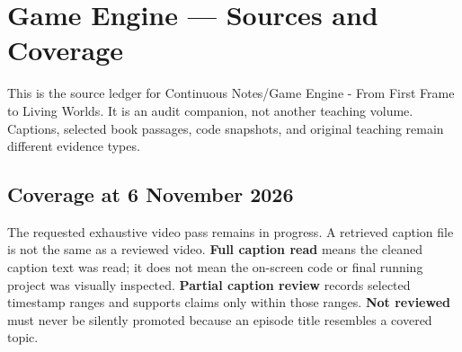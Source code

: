 \hypertarget{appendix-877738f6f4d2}{}\label{referencestart:appendix-877738f6f4d2}
\section{Game Engine --- Sources and Coverage}\label{appendix-877738f6f4d2-game-engine-sources-and-coverage}

\hypertarget{appendix-877738f6f4d2-game-engine-sources-and-coverage}{}

This is the source ledger for {Continuous Notes/Game Engine - From First Frame to Living Worlds}. It is an audit companion, not another teaching volume. Captions, selected book passages, code snapshots, and original teaching remain different evidence types.

\subsection{Coverage at 6 November 2026}\label{appendix-877738f6f4d2-coverage-at-6-november-2026}

\hypertarget{appendix-877738f6f4d2-coverage-at-6-november-2026}{}

The requested exhaustive video pass remains in progress. A retrieved caption file is not the same as a reviewed video. \textbf{Full caption read} means the cleaned caption text was read; it does not mean the on-screen code or final running project was visually inspected. \textbf{Partial caption review} records selected timestamp ranges and supports claims only within those ranges. \textbf{Not reviewed} must never be silently promoted because an episode title resembles a covered topic.

